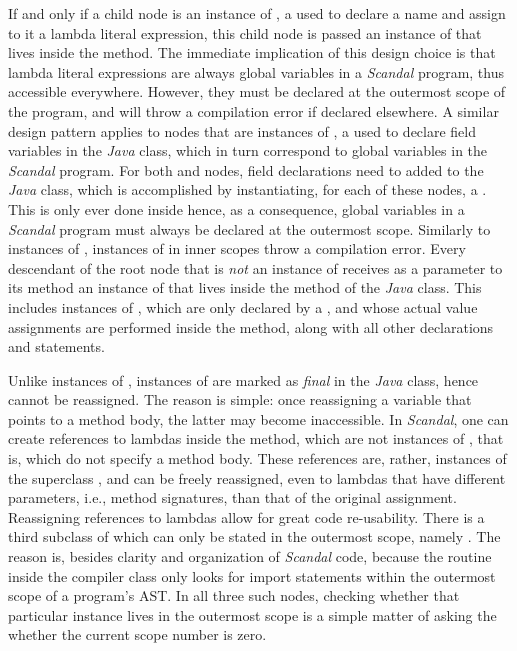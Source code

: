 If and only if a child node is an instance of , a  used to declare a name and assign to it a lambda literal expression, this child node is passed an instance of  that lives inside the  method. The immediate implication of this design choice is that lambda literal expressions are always global variables in a \emph{Scandal} program, thus accessible everywhere. However, they must be declared at the outermost scope of the program, and will throw a compilation error if declared elsewhere. A similar design pattern applies to nodes that are instances of , a  used to declare field variables in the \emph{Java} class, which in turn correspond to global variables in the \emph{Scandal} program. For both  and  nodes, field declarations need to added to the \emph{Java} class, which is accomplished by instantiating, for each of these nodes, a . This is only ever done inside  hence, as a consequence, global variables in a \emph{Scandal} program must always be declared at the outermost scope. Similarly to instances of , instances of  in inner scopes throw a compilation error. Every descendant of the root node that is \emph{not} an instance of  receives as a parameter to its  method an instance of  that lives inside the  method of the \emph{Java} class. This includes instances of , which are only declared by a , and whose actual value assignments are performed inside the  method, along with all other declarations and statements.

Unlike instances of , instances of  are marked as \emph{final} in the \emph{Java} class, hence cannot be reassigned. The reason is simple: once reassigning a variable that points to a method body, the latter may become inaccessible. In \emph{Scandal}, one can create references to lambdas inside the  method, which are not instances of , that is, which do not specify a method body. These references are, rather, instances of the superclass , and can be freely reassigned, even to lambdas that have different parameters, i.e., method signatures, than that of the original assignment. Reassigning references to lambdas allow for great code re-usability. There is a third subclass of  which can only be stated in the outermost scope, namely . The reason is, besides clarity and organization of \emph{Scandal} code, because the  routine inside the compiler class only looks for import statements within the outermost scope of a program's AST. In all three such nodes, checking whether that particular instance lives in the outermost scope is a simple matter of asking the  whether the current scope number is zero.

